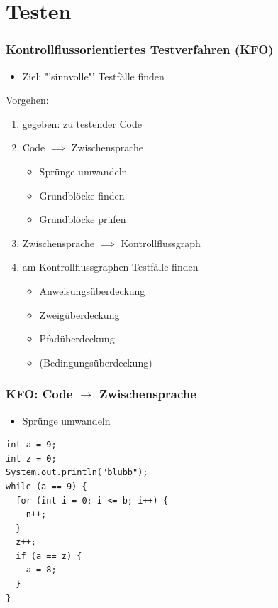 \documentclass[18pt]{beamer}
\begin{document}
\section{Testen}

	\begin{frame}
		\frametitle{Kontrollflussorientiertes Testverfahren (KFO)}
		\begin{itemize}
			\item Ziel: "'sinnvolle"' Testfälle finden
		\end{itemize}
		Vorgehen:
		\begin{enumerate}
			\item gegeben: zu testender Code \pause
			\item Code $\implies$ Zwischensprache
			\begin{itemize}
				\item Sprünge umwandeln
				\item Grundblöcke finden
				\item Grundblöcke prüfen
			\end{itemize}
			\pause
			\item Zwischensprache $\implies$ Kontrollflussgraph \pause
			\item am Kontrollflussgraphen Testfälle finden \pause
			\begin{itemize}
				\item Anweisungsüberdeckung
				\item Zweigüberdeckung 
				\item Pfadüberdeckung
				\item (Bedingungsüberdeckung)
			\end{itemize}
		\end{enumerate}
	\end{frame}

	\begin{frame}[fragile]
		\frametitle{KFO: Code $\rightarrow$ Zwischensprache}
		\begin{itemize}
			\item Sprünge umwandeln
		\end{itemize}
	\centering
			\begin{verbatim}
int a = 9;
int z = 0;
System.out.println("blubb");
while (a == 9) {
  for (int i = 0; i <= b; i++) {
    n++;
  }
  z++;
  if (a == z) {
    a = 8;
  }
}
			\end{verbatim}
	\end{frame}
\end{document}
